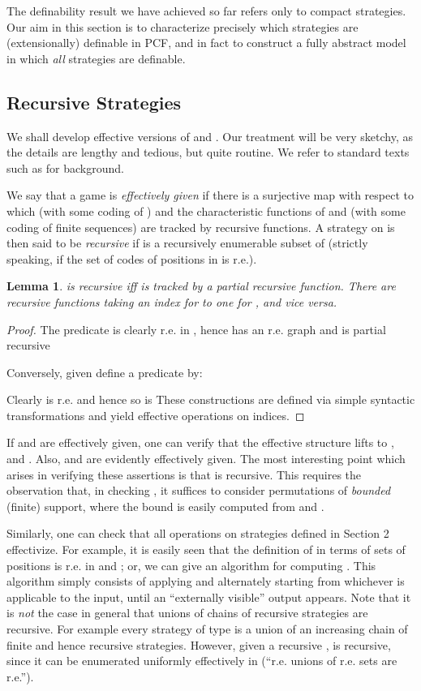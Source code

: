 \documentclass[11pt]{article}
\newtheorem{lemma}[theorem]{Lemma}
\begin{document}
The definability result we have achieved so far refers only to compact
strategies. Our aim in this section is to characterize precisely which
strategies are (extensionally) definable in PCF, and in fact to
construct a fully abstract model in which {\em all} strategies are
definable.

\subsection{ Recursive Strategies}

We shall develop effective versions of  and . Our treatment will be
very sketchy, as the details are lengthy and tedious, but quite routine.
We refer to standard texts such as \cite{SoareRI:recesd} for background.

We say that a game  is {\em effectively given} if there is a surjective map
 with respect to which  (with some
coding of ) and the characteristic functions of  and
 (with some coding of finite sequences) are tracked by recursive
functions. A strategy  on  is then said to be {\em recursive}
if  is a recursively enumerable subset of 
(strictly speaking, if the set of codes of positions in  is r.e.).

\begin{lemma}\label{uni.1}
 is recursive iff  is tracked by a partial recursive
function. There are recursive functions taking an index for  to
one for , and vice versa.
\end{lemma}
\begin{proof} The predicate  is clearly r.e. in , hence  has an r.e.
graph and is partial recursive

Conversely, given  define  a predicate  by:


Clearly  is r.e. and hence so is  These constructions are defined via
simple syntactic transformations and yield effective operations on
indices. \end{proof}

If  and  are effectively given, one can verify that the effective
structure lifts to ,  and . Also,
 and  are evidently effectively given. The most interesting point
which arises in verifying these assertions is that  is
recursive. This requires the observation that, in checking ,
it suffices to consider permutations  of {\em bounded}
(finite) support, where the bound is easily computed from  and .

Similarly, one can check that all operations on strategies defined in
Section 2 effectivize. For example, it is easily seen that the definition of
 in terms of sets of positions is r.e. in  and ;
or, we can give an algorithm for computing . This algorithm
simply consists of applying  and  alternately starting from
whichever is applicable to the input, until an ``externally visible'' output
appears. Note that it is {\sl not} the case in general that unions of
chains of recursive strategies are recursive. For example every
strategy of type  is a union of an increasing chain of finite
and hence recursive strategies. However, given a recursive
,  is recursive, since it can be enumerated uniformly effectively
in  (``r.e. unions of r.e. sets are r.e.'').
\end{document}
